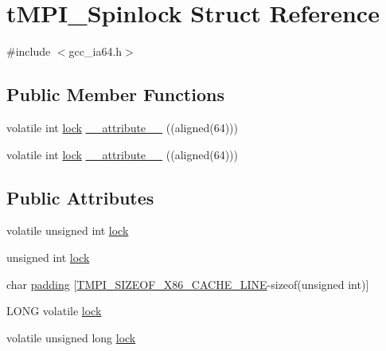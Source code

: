 \hypertarget{structtMPI__Spinlock}{\section{t\-M\-P\-I\-\_\-\-Spinlock \-Struct \-Reference}
\label{structtMPI__Spinlock}
}


{\ttfamily \#include $<$gcc\-\_\-ia64.\-h$>$}

\subsection*{\-Public \-Member \-Functions}
\begin{DoxyCompactItemize}
\item 
volatile int \hyperlink{structtMPI__Spinlock_ae208ed28e201a43a82eb1e30ceb58525}{lock} \hyperlink{structtMPI__Spinlock_ab41228b8d64e06ef330d529788fb5d3d}{\-\_\-\-\_\-attribute\-\_\-\-\_\-} ((aligned(64)))
\item 
volatile int \hyperlink{structtMPI__Spinlock_ae208ed28e201a43a82eb1e30ceb58525}{lock} \hyperlink{structtMPI__Spinlock_ab41228b8d64e06ef330d529788fb5d3d}{\-\_\-\-\_\-attribute\-\_\-\-\_\-} ((aligned(64)))
\end{DoxyCompactItemize}
\subsection*{\-Public \-Attributes}
\begin{DoxyCompactItemize}
\item 
volatile unsigned int \hyperlink{structtMPI__Spinlock_ae208ed28e201a43a82eb1e30ceb58525}{lock}
\item 
unsigned int \hyperlink{structtMPI__Spinlock_a30a2c21d35a451723a3fd1dcbbfbb471}{lock}
\item 
char \hyperlink{structtMPI__Spinlock_a47d3018a35301f4841b9615c0e696bc0}{padding} \mbox{[}\hyperlink{share_2template_2gromacs_2thread__mpi_2atomic_2gcc__x86_8h_aecf8996b3f8284831e7b2b0dca7e681d}{\-T\-M\-P\-I\-\_\-\-S\-I\-Z\-E\-O\-F\-\_\-\-X86\-\_\-\-C\-A\-C\-H\-E\-\_\-\-L\-I\-N\-E}-\/sizeof(unsigned int)\mbox{]}
\item 
\-L\-O\-N\-G volatile \hyperlink{structtMPI__Spinlock_a7c60d07e1a16d33c77f769a2d8bc9e6e}{lock}
\item 
volatile unsigned long \hyperlink{structtMPI__Spinlock_ae208ed28e201a43a82eb1e30ceb58525}{lock}
\end{DoxyCompactItemize}


